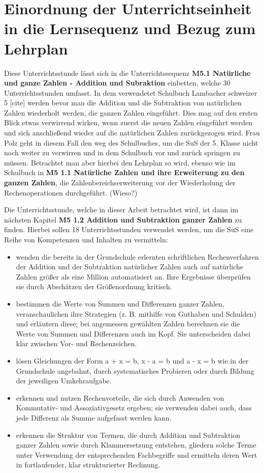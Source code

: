 \chapter{Einordnung der Unterrichtseinheit in die Lernsequenz und Bezug zum Lehrplan}
Diese Unterrichtsstunde lässt sich in die Unterrichtssequenz \textbf{M5.1 Natürliche und ganze Zahlen - Addition und Subraktion} einbetten, welche 30 Unterrichtsstunden umfasst. In dem verwendetet Schulbuch Lambacher schweizer 5 [cite] werden bevor man die Addition und die Subtraktion von natürlichen Zahlen wiederholt werden, die ganzen Zahlen eingeführt. Dies mag auf den ersten Blick etwas verwirrend wirken, wenn zuerst die \glqq neuen \grqq Zahlen eingeführt werden und sich anschließend wieder auf die natürlichen Zahlen zurückgezogen wird. Frau Polz geht in diesem Fall den weg des Schulbuches, um die SuS der 5. Klasse nicht noch weiter zu verwirren und in dem Schulbuch vor und zurück springen zu müssen. Betrachtet man aber hierbei den Lehrplan so wird, ebenso wie im Schulbuch in \textbf{M5 1.1 Natürliche Zahlen und ihre Erweiterung zu den ganzen Zahlen}, die Zahlenbereichserweiterung vor der Wiederholung der Rechenoperationen durchgeführt. (Wieso?)

Die Unterrichtsstunde, welche in dieser Arbeit betrachtet wird, ist dann im nächsten Kapitel \textbf{M5 1.2 Addition und Subtraktion ganzer Zahlen} zu finden. Hierbei sollen 18 Unterrichtsstunden verwendet werden, um die SuS eine Reihe von Kompetenzen und Inhalten zu vermitteln: 

\begin{itemize}
\item wenden die bereits in der Grundschule erlernten schriftlichen Rechenverfahren der Addition und der Subtraktion natürlicher Zahlen auch auf natürliche Zahlen größer als eine Million automatisiert an. Ihre Ergebnisse überprüfen sie durch Abschätzen der Größenordnung kritisch. 
\item bestimmen die Werte von Summen und Differenzen ganzer Zahlen, veranschaulichen ihre Strategien (z. B. mithilfe von Guthaben und Schulden) und erläutern diese; bei angemessen gewählten Zahlen berechnen sie die Werte von Summen und Differenzen auch im Kopf. Sie unterscheiden dabei klar zwischen Vor- und Rechenzeichen. 
\item lösen Gleichungen der Form a + x = b, x - a = b und a - x = b wie in der Grundschule angebahnt, durch systematisches Probieren oder durch Bildung der jeweiligen Umkehraufgabe. 
\item erkennen und nutzen Rechenvorteile, die sich durch Anwenden von Kommutativ- und Assoziativgesetz ergeben; sie verwenden dabei auch, dass jede Differenz als Summe aufgefasst werden kann. 
\item erkennen die Struktur von Termen, die durch Addition und Subtraktion ganzer Zahlen sowie durch Klammersetzung entstehen, gliedern solche Terme unter Verwendung der entsprechenden Fachbegriffe und ermitteln deren Wert in fortlaufender, klar strukturierter Rechnung. 
\end{itemize}\cite{LehrplanGymnasium}


